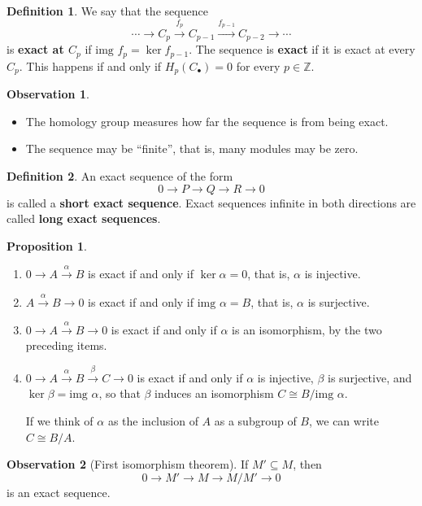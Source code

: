\documentclass{book}
\theoremstyle{definition}
\newtheorem*{defn}{Definition}
\newtheorem*{obs}{Observation}
\newtheorem*{prop}{Proposition}
\begin{document}
\begin{defn}
We say that the sequence
$$
\cdots \to C_p \xrightarrow{f_p} C_{p-1}
\xrightarrow{f_{p-1}} C_{p-2}\to\cdots
$$
is \textbf{exact at $C_p$} if
$\text{img }f_p=\ker f_{p-1}$. The sequence is
\textbf{exact} if it is exact at every $C_p$. This happens if
and only if $H_p(C_\bullet)=0$ for every $p\in\mathbb Z$.
\end{defn}

\begin{obs}\leavevmode
\begin{itemize}
\item The homology group measures how far the sequence is
from being exact.
\item The sequence may be ``finite'', that is, many modules
may be zero.
\end{itemize}
\end{obs}

\begin{defn}
An exact sequence of the form
$$
0\to P\to Q\to R\to0
$$
is called a \textbf{short exact sequence}. Exact sequences
infinite in both directions are called \textbf{long exact
sequences}.
\end{defn}

\begin{prop}\label{sucex}\leavevmode
\begin{enumerate}
\item $0\to A\xrightarrow{\alpha}B$ is exact if and only if
$\ker\alpha=0$, that is, $\alpha$ is injective.
\item $A\xrightarrow{\alpha}B\to0$ is exact if and only if
$\text{img }\alpha=B$, that is, $\alpha$ is surjective.
\item $0\to A\xrightarrow{\alpha}B\to0$ is exact if and only
if $\alpha$ is an isomorphism, by the two preceding items.
\item $0\to A\xrightarrow{\alpha}B\xrightarrow{\beta}C\to0$
is exact if and only if $\alpha$ is injective, $\beta$ is
surjective, and $\ker\beta=\text{img }\alpha$, so that
$\beta$ induces an isomorphism $C\cong B/\text{img }\alpha$.

If we think of $\alpha$ as the inclusion of $A$ as a subgroup
of $B$, we can write $C\cong B/A$.
\end{enumerate}
\end{prop}

\begin{obs}[First isomorphism theorem]
If $M'\subseteq M$, then
$$
0\to M'\to M\to M/M'\to0
$$
is an exact sequence.
\end{obs}
\end{document}
